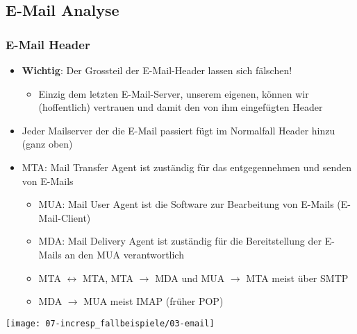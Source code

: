 \subsection{E-Mail Analyse}

\subsubsection{E-Mail Header}
\begin{itemize}
    \item \textbf{Wichtig}: Der Grossteil der E-Mail-Header lassen sich fälschen!
    \begin{itemize}
        \item Einzig dem letzten E-Mail-Server, unserem eigenen, können wir (hoffentlich) vertrauen und damit den von ihm eingefügten Header
    \end{itemize}
    \item Jeder Mailserver der die E-Mail passiert fügt im Normalfall Header hinzu (ganz oben)
    \item MTA: Mail Transfer Agent ist zuständig für das entgegennehmen und senden von E-Mails
    \begin{itemize}
        \item MUA: Mail User Agent ist die Software zur Bearbeitung von E-Mails (E-Mail-Client)
        \item MDA: Mail Delivery Agent ist zuständig für die Bereitstellung der E-Mails an den MUA verantwortlich
        \item MTA $\leftrightarrow $ MTA, MTA $\rightarrow$ MDA und MUA $\rightarrow$  MTA meist über SMTP
        \item MDA $\rightarrow$ MUA meist IMAP (früher POP)
    \end{itemize}
\end{itemize}

\begin{center}
    \texttt{[image: 07-incresp\_fallbeispiele/03-email]}
\end{center}

